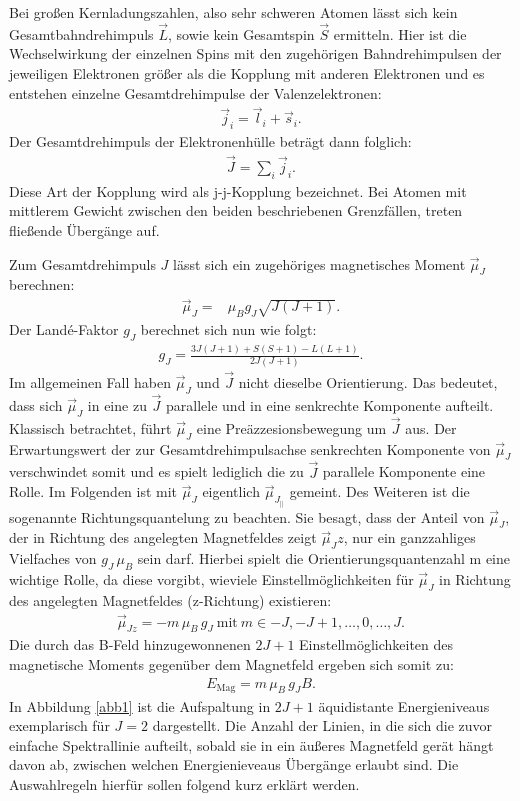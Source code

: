 \noindent Bei großen Kernladungszahlen, also sehr schweren Atomen lässt sich kein Gesamtbahndrehimpuls $\vec{L}$,
sowie kein Gesamtspin $\vec{S}$ ermitteln. Hier ist die Wechselwirkung der einzelnen Spins mit den zugehörigen
Bahndrehimpulsen der jeweiligen Elektronen größer als die Kopplung mit anderen Elektronen und es
entstehen einzelne Gesamtdrehimpulse der Valenzelektronen:
\begin{align*}
    \vec{j}_i = \vec{l}_i + \vec{s}_i.
\end{align*}
Der Gesamtdrehimpuls der Elektronenhülle beträgt dann folglich:
\begin{align*}
    \vec{J} = \sum_i \vec{j}_i.
\end{align*}
Diese Art der Kopplung wird als j-j-Kopplung bezeichnet.
Bei Atomen mit mittlerem Gewicht zwischen den beiden beschriebenen Grenzfällen, treten fließende Übergänge auf.

\noindent Zum Gesamtdrehimpuls $J$ lässt sich ein zugehöriges magnetisches Moment
$\vec{\mu}_J$ berechnen:
\begin{align*}
    \vec{\mu}_J =& \mu_B g_J \sqrt{J(J+1)}.
\end{align*}
Der Landé-Faktor $g_J$ berechnet sich nun wie folgt:
\begin{align*}
    g_J = \frac{3J(J+1) + S(S+1) - L(L+1)}{2J(J+1)}.
\end{align*}
Im allgemeinen Fall haben $\vec{\mu}_J$ und $\vec{J}$ nicht dieselbe Orientierung. Das bedeutet, dass
sich $\vec{\mu}_J$ in eine zu $\vec{J}$ parallele und in eine senkrechte Komponente aufteilt. Klassisch
betrachtet, führt $\vec{\mu}_J$ eine Preäzzesionsbewegung um $\vec{J}$ aus. Der Erwartungswert der zur Gesamtdrehimpulsachse
senkrechten Komponente von $\vec{\mu}_J$ verschwindet somit und es spielt lediglich die zu $\vec{J}$ parallele
Komponente eine Rolle. Im Folgenden ist mit $\vec{\mu}_J$ eigentlich $\vec{\mu}_{J_{||}}$ gemeint.
Des Weiteren ist die sogenannte Richtungsquantelung zu beachten. Sie besagt, dass der Anteil von $\vec{\mu}_J$, der in Richtung
des angelegten Magnetfeldes zeigt $\vec{\mu}_Jz$, nur ein ganzzahliges Vielfaches von $g_J \, \mu_B$ sein darf.
Hierbei spielt die Orientierungsquantenzahl m eine wichtige Rolle, da diese vorgibt, wieviele Einstellmöglichkeiten
für $\vec{\mu}_J$ in Richtung des angelegten Magnetfeldes (z-Richtung) existieren:
\begin{align*}
    \vec{\mu}_{Jz} = - m \, \mu_B \, g_J \ \text{mit} \ m \in {-J, -J+1, \dots,0, \dots, J}.
\end{align*}
Die durch das B-Feld hinzugewonnenen $2J+1$ Einstellmöglichkeiten des magnetische Moments gegenüber
dem Magnetfeld ergeben sich somit zu:
\begin{align*}
    E_{\text{Mag}} = m \, \mu_B \, g_J B.
\end{align*}
In Abbildung \ref{abb1} ist die Aufspaltung in $2J+1$ äquidistante Energieniveaus exemplarisch für $J=2$
dargestellt.
Die Anzahl der Linien, in die sich die zuvor einfache Spektrallinie aufteilt, sobald
sie in ein äußeres Magnetfeld gerät hängt davon ab, zwischen welchen Energienieveaus
Übergänge erlaubt sind. Die Auswahlregeln hierfür sollen folgend kurz erklärt werden.

